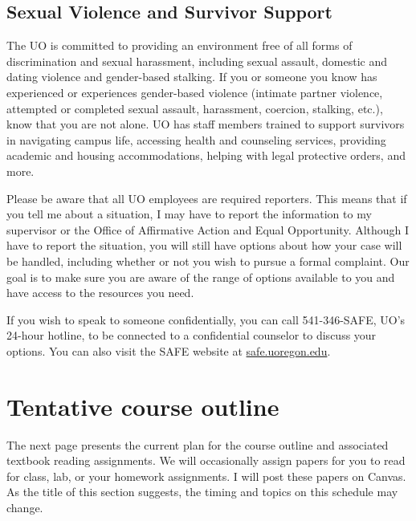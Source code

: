 \documentclass[10pt]{article}
\begin{document}
\subsection*{Sexual Violence and Survivor Support}

The UO is committed to providing an environment free of all forms of discrimination and sexual harassment, including sexual assault, domestic and dating violence and gender-based stalking. If you or someone you know has experienced or experiences gender-based violence (intimate partner violence, attempted or completed sexual assault, harassment, coercion, stalking, etc.), know that you are not alone. UO has staff members trained to support survivors in navigating campus life, accessing health and counseling services, providing academic and housing accommodations, helping with legal protective orders, and more.

 Please be aware that all UO employees are required reporters. This means that if you tell me about a situation, I may have to report the information to my supervisor or the Office of Affirmative Action and Equal Opportunity. Although I have to report the situation, you will still have options about how your case will be handled, including whether or not you wish to pursue a formal complaint. Our goal is to make sure you are aware of the range of options available to you and have access to the resources you need. 

 If you wish to speak to someone confidentially, you can call 541-346-SAFE, UO's 24-hour hotline, to be connected to a confidential counselor to discuss your options. You can also visit the SAFE website at \href{safe.uoregon.edu}{safe.uoregon.edu}.

\newpage
\section*{Tentative course outline}

The next page presents the current plan for the course outline and associated textbook reading assignments. We will occasionally assign papers for you to read for class, lab, or your homework assignments. I will post these papers on Canvas. As the title of this section suggests, the timing and topics on this schedule may change.
\end{document}
